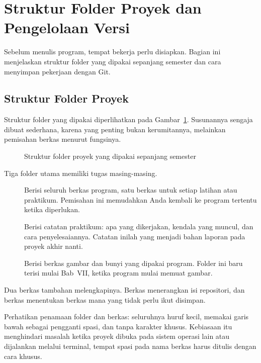 \section{Struktur Folder Proyek dan Pengelolaan Versi}
\label{sec:struktur-git}

Sebelum menulis program, tempat bekerja perlu disiapkan. Bagian ini menjelaskan
struktur folder yang dipakai sepanjang semester dan cara menyimpan pekerjaan
dengan Git.

\subsection{Struktur Folder Proyek}

Struktur folder yang dipakai diperlihatkan pada Gambar~\ref{fig:struktur-proyek}.
Susunannya sengaja dibuat sederhana, karena yang penting bukan kerumitannya,
melainkan pemisahan berkas menurut fungsinya.

\begin{figure}[htbp]
\centering

\caption{Struktur folder proyek yang dipakai sepanjang semester}
\label{fig:struktur-proyek}
\end{figure}

Tiga folder utama memiliki tugas masing-masing.

\begin{description}
  \item[] Berisi seluruh berkas program, satu berkas untuk setiap
        latihan atau praktikum. Pemisahan ini memudahkan Anda kembali ke
        program tertentu ketika diperlukan.
  \item[] Berisi catatan praktikum: apa yang dikerjakan, kendala
        yang muncul, dan cara penyelesaiannya. Catatan inilah yang menjadi
        bahan laporan pada proyek akhir nanti.
  \item[] Berisi berkas gambar dan bunyi yang dipakai program.
        Folder ini baru terisi mulai Bab~VII, ketika program mulai memuat
        gambar.
\end{description}

Dua berkas tambahan melengkapinya. Berkas  menerangkan isi
repositori, dan berkas  menentukan berkas mana yang tidak
perlu ikut disimpan.

Perhatikan penamaan folder dan berkas: seluruhnya huruf kecil, memakai garis
bawah sebagai pengganti spasi, dan tanpa karakter khusus. Kebiasaan itu
menghindari masalah ketika proyek dibuka pada sistem operasi lain atau
dijalankan melalui terminal, tempat spasi pada nama berkas harus ditulis
dengan cara khusus.

